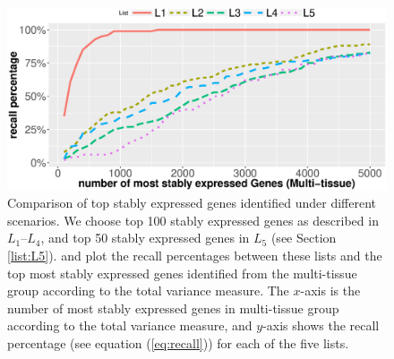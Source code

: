 \documentclass[letterpaper,12pt]{article}
\begin{document}

\begin{figure}[h!]
    \begin{center}
	\includegraphics[scale=0.55]{Figures/rankVSrank_RNA2.eps}
	\caption{Comparison of top stably expressed genes identified under different scenarios.
	We choose top 100 stably expressed genes as described in $L_1$--$L_4$,
	and top 50 stably expressed genes in $L_5$ (see Section \ref{list:L5}). 
	and plot the recall percentages between these lists and the top most
	stably expressed genes identified from the  multi-tissue group
	according to the total variance measure.
	The $x$-axis is the number of most stably expressed genes in multi-tissue
	group according to the total variance measure, and $y$-axis shows the
	recall percentage (see equation (\ref{eq:recall}))  for each of the
	five lists.}
	\label{fig:rankVSrank_RNA}
    \end{center}
\end{figure}
\end{document}
